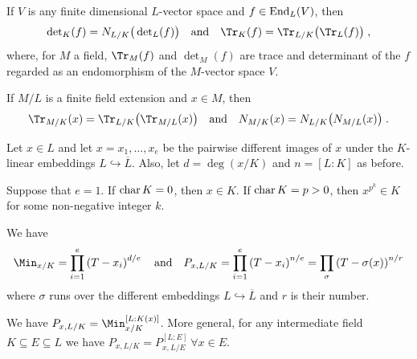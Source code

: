 \documentclass[a4paper,parskip=half,numbers=enddot, DIV=12]{scrreprt}
\begin{document}
\begin{thm}
	\begin{alphanumerate}
		\item {}
		If $V$ is any finite dimensional $L$-vector space and $f\in \operatorname{End}_L(V)$, then
		\begin{align*}
			\det_K(f) = N_{L/K}\big(\det_L(f)\big)\quad\text{and}\quad\Tr_K(f) = \Tr_{L/K}\big(\Tr_L(f)\big)\;,
		\end{align*}
		where, for $M$ a field, $\Tr_M(f)$ and $\det_M(f)$ are trace and determinant of the $f$ regarded as an endomorphism of the $M$-vector space $V$.
		\item 
		If $M/L$ is a finite field extension and $x\in M$, then
		\begin{align*}
			\Tr_{M/K}(x) = \Tr_{L/K}\big(\Tr_{M/L}(x)\big)\quad\text{and}\quad N_{M/K}(x) = N_{L/K}\big(N_{M/L}(x)\big)\;.
		\end{align*}
	\end{alphanumerate}
	Let $x\in L$ and let $x=x_1,\ldots, x_e$ be the pairwise different images of $x$ under the $K$-linear embeddings $L\hookrightarrow\overline{L}$. Also, let $d=\deg(x/K)$ and $n= [L:K]$ as before.
	\begin{alphanumerate}\setcounter{enumi}{2}
		\item Suppose that $e=1$. If $\operatorname{char} K=0$, then $x\in K$. If $\operatorname{char} K=p>0$, then $x^{p^k}\in K$ for some non-negative integer $k$.
		\item We have 
		\begin{align*}
			\Min_{x/K} = \prod_{i=1}^e \left(T-x_i\right)^{d/e}\quad\text{and}\quad P_{x,L/K} = \prod_{i=1}^e \left(T-x_i\right)^{n/e} = \prod_{\sigma}\left(T-\sigma(x)\right)^{n/r}
		\end{align*}
		where $\sigma$ runs over the different embeddings $L\hookrightarrow \overline{L}$ and $r$ is their number.
		\item We have $P_{x,L/K}=\Min_{x/K}^{[L:K(x)]}$. More general, for any intermediate field $K\subseteq E \subseteq L$ we have $P_{x,L/K} = P_{x,L/E}^{[L:E]}\ \forall x\in E$.
	\end{alphanumerate}
\end{thm}
\end{document}
